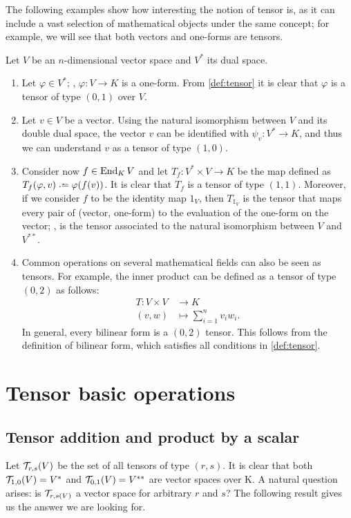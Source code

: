 \begin{example}
	\label{ex:tensors}
	The following examples show how interesting the notion of tensor is, as it can include a vast selection of mathematical objects under the same concept; for example, we will see that both vectors and one-forms are tensors.

	Let $V$ be an $n$-dimensional vector space and $V^*$ its dual space.
	\begin{enumerate}
		\item Let $\varphi \in V^*$; \ie,  $\varphi \colon V \to K$ is a one-form. From \autoref{def:tensor} it is clear that $\varphi$ is a tensor of type $(0,1)$ over $V$.
		\item Let $v \in V$ be a vector. Using the natural isomorphism between $V$ and its double dual space, the vector $v$ can be identified with $\psi_v \colon V^* \to K$, and thus we can understand $v$ as a tensor of type $(1,0)$.
		\item Consider now $f \in \operatorname{End}_K V$ and let $T_f \colon V^* \times V \to K$ be the map defined as $T_f(\varphi, v) \defeq \varphi(f(v))$. It is clear that $T_f$ is a tensor of type $(1,1)$. Moreover, if we consider $f$ to be the identity map $1_V$, then $T_{1_V}$ is the tensor that maps every pair of (vector, one-form) to the evaluation of the one-form on the vector; \ie, is the tensor associated to the natural isomorphism between $V$ and $V^{**}$.
		\item Common operations on several mathematical fields can also be seen as tensors. For example, the inner product can be defined as a tensor of type $(0,2)$ as follows:
		\begin{align*}
			T \colon V \times V &\to K\\
			(v,w) &\mapsto \sum_{i=1}^n v_i w_i.
		\end{align*}
		In general, every bilinear form is a $(0,2)$ tensor. This follows from the definition of bilinear form, which satisfies all conditions in \autoref{def:tensor}.
	\end{enumerate}
\end{example}

\section{Tensor basic operations}

\subsection{Tensor addition and product by a scalar}
Let ${\mathcal T}_{r,s}(V)$ be the set of all tensors of type $(r,s)$. It is clear that both ${\mathcal T}_{1,0}(V) = V^*$ and ${\mathcal T}_{0,1}(V) = V^{**}$ are vector spaces over K. A natural question arises: is ${\mathcal T}_{r,s(V)}$ a vector space for arbitrary $r$ and $s$? The following result gives us the answer we are looking for.

